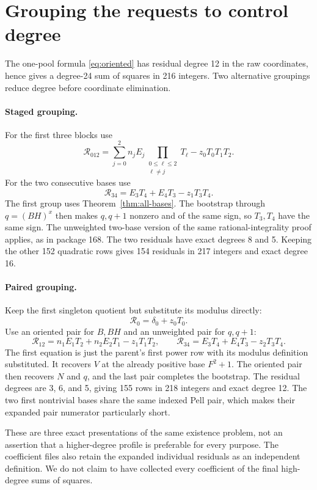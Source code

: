 \documentclass[11pt]{article}
\theoremstyle{definition}\newtheorem{definition}[theorem]{Definition}
\theoremstyle{remark}\newtheorem{remark}[theorem]{Remark}
\begin{document}
\section{Grouping the requests to control degree}
\label{sec:groupings}

The one-pool formula \eqref{eq:oriented} has residual degree 12 in the
raw coordinates, hence gives a degree-24 sum of squares in 216 integers.
Two alternative groupings reduce degree before coordinate elimination.

\paragraph{Staged grouping.}
For the first three blocks use
\[
\mathcal R_{012}=\sum_{j=0}^{2}n_jE_j
\prod_{\substack{0\le\ell\le2\\\ell\ne j}}T_\ell
-z_0T_0T_1T_2.
\]
For the two consecutive bases use
\[
\mathcal R_{34}=E_3T_4+E_4T_3-z_1T_3T_4.
\]
The first group uses Theorem~\ref{thm:all-bases}. The bootstrap through
$q=(BH)^x$ then makes $q,q+1$ nonzero and of the same sign, so
$T_3,T_4$ have the same sign. The unweighted two-base version of the
same rational-integrality proof applies, as in package 168. The two
residuals have exact degrees 8 and 5. Keeping the other 152 quadratic
rows gives 154 residuals in 217 integers and exact degree 16.

\paragraph{Paired grouping.}
Keep the first singleton quotient but substitute its modulus directly:
\[
\mathcal R_0=\delta_0+z_0T_0.
\]
Use an oriented pair for $B,BH$ and an unweighted pair for $q,q+1$:
\[
\mathcal R_{12}=n_1E_1T_2+n_2E_2T_1-z_1T_1T_2,
\qquad
\mathcal R_{34}=E_3T_4+E_4T_3-z_2T_3T_4.
\]
The first equation is just the parent's first power row with its modulus
definition substituted. It recovers $V$ at the already positive base
$F^2+1$. The oriented pair then recovers $N$ and $q$, and the last
pair completes the bootstrap. The residual degrees are 3, 6, and 5,
giving 155 rows in 218 integers and exact degree 12. The two first
nontrivial bases share the same indexed Pell pair, which makes their
expanded pair numerator particularly short.

These are three exact presentations of the same existence problem, not
an assertion that a higher-degree profile is preferable for every purpose.
The coefficient files also retain the expanded individual residuals as
an independent definition. We do not claim to have collected every
coefficient of the final high-degree sums of squares.
\end{document}
